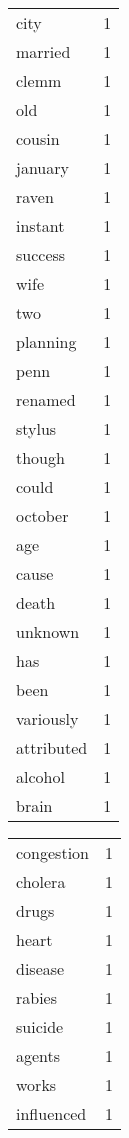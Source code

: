 \begin{center}
\begin{scriptsize}
\begin{tabular}{|ll|}
city          & 1\\%
married       & 1\\%
clemm         & 1\\%
old           & 1\\%
cousin        & 1\\%
january       & 1\\%
raven         & 1\\%
instant       & 1\\%
success       & 1\\%
wife          & 1\\%
two           & 1\\%
planning      & 1\\%
penn          & 1\\%
renamed       & 1\\%
stylus        & 1\\%
though        & 1\\%
could         & 1\\%
october       & 1\\%
age           & 1\\%
cause         & 1\\%
death         & 1\\%
unknown       & 1\\%
has           & 1\\%
been          & 1\\%
variously     & 1\\%
attributed    & 1\\%
alcohol       & 1\\%
brain         & 1\\%
\hline
\end{tabular}
\begin{tabular}{|ll|}
\hline
congestion    & 1\\%
cholera       & 1\\%
drugs         & 1\\%
heart         & 1\\%
disease       & 1\\%
rabies        & 1\\%
suicide       & 1\\%
agents        & 1\\%
works         & 1\\%
influenced    & 1\\%

\end{tabular}
\end{scriptsize}
\end{center}
